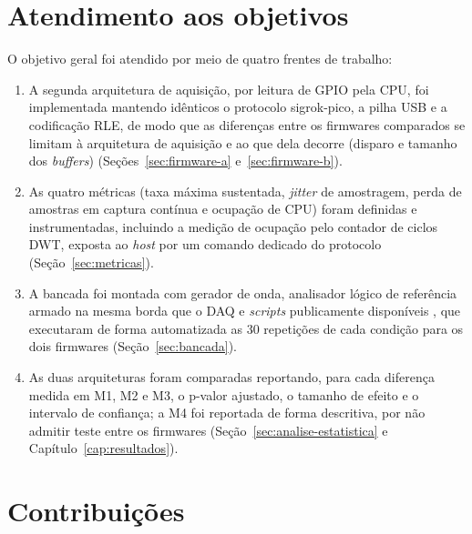 \section{Atendimento aos objetivos}

O objetivo geral foi atendido por meio de quatro frentes de trabalho:

\begin{enumerate}
  \item A segunda arquitetura de aquisição, por leitura de \ac{GPIO} pela \ac{CPU}, foi
        implementada mantendo idênticos o protocolo sigrok-pico, a pilha \ac{USB} e a
        codificação \ac{RLE}, de modo que as diferenças entre os firmwares comparados
        se limitam à arquitetura de aquisição e ao que dela decorre (disparo e tamanho
        dos \emph{buffers}) (Seções~\ref{sec:firmware-a} e~\ref{sec:firmware-b}).
  \item As quatro métricas (taxa máxima sustentada, \emph{jitter} de amostragem, perda
        de amostras em captura contínua e ocupação de \ac{CPU}) foram definidas e
        instrumentadas, incluindo a medição de ocupação pelo contador de ciclos
        \ac{DWT}, exposta ao \emph{host} por um comando dedicado do protocolo
        (Seção~\ref{sec:metricas}).
  \item A bancada foi montada com gerador de onda, analisador lógico de referência
        armado na mesma borda que o \ac{DAQ} e \emph{scripts} publicamente
        disponíveis \cite{dias2026artefatos}, que
        executaram de forma automatizada as 30 repetições de cada condição para os dois
        firmwares (Seção~\ref{sec:bancada}).
  \item As duas arquiteturas foram comparadas reportando, para cada diferença medida
        em M1, M2 e M3, o p-valor ajustado, o tamanho de efeito e o intervalo de
        confiança; a M4 foi reportada de forma descritiva, por não admitir teste
        entre os firmwares (Seção~\ref{sec:analise-estatistica} e
        Capítulo~\ref{cap:resultados}).
\end{enumerate}

\section{Contribuições}

